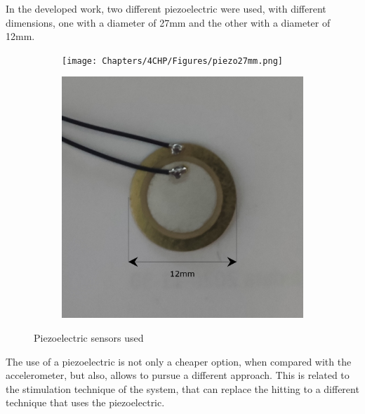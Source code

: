 In the developed work, two different piezoelectric were used, with different dimensions, one with a diameter of 27mm and the other with a diameter of 12mm.

\begin{figure}[]
    \centering
    \begin{subfigure}{0.45\textwidth}
        \centering
        \texttt{[image: Chapters/4CHP/Figures/piezo27mm.png]}
        \caption{}{}
        \label{subfig:piezo1}
    \end{subfigure}
    \begin{subfigure}{0.45\textwidth}
        \centering
        \includegraphics[width=\linewidth]{Chapters/4CHP/Figures/piezo12mm.png}
        \caption{}{}
        \label{subfig:piezo2}
    \end{subfigure}
    \caption{Piezoelectric sensors used}{}
    \label{fig:UsedPiezos}
\end{figure}
The use of a piezoelectric is not only a cheaper option, when compared with the accelerometer, but also, allows to pursue a different approach. This is related to the stimulation technique of the system, that can replace the hitting to a different technique that uses the piezoelectric. 

